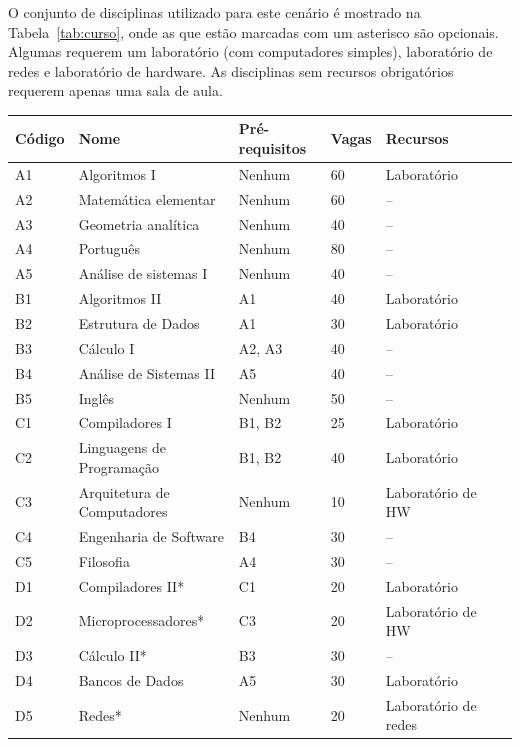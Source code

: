 O conjunto de disciplinas utilizado para este cenário é mostrado na Tabela~\ref{tab:curso}, onde as que estão marcadas com um asterisco são opcionais. Algumas requerem um laboratório (com computadores simples), laboratório de redes e laboratório de hardware. As disciplinas sem recursos obrigatórios requerem apenas uma sala de aula.

\begin{table}\centering\footnotesize
  \begin{tabular*}{1\textwidth}{@{}lllllll@{}}
    \toprule
    Código & Nome & Pré-requisitos & Vagas & Recursos \\
    \midrule
    A1 & Algoritmos I           & Nenhum & 60 & Laboratório \\
    A2 & Matemática elementar   & Nenhum & 60 & -- \\
    A3 & Geometria analítica    & Nenhum & 40 & -- \\
    A4 & Português              & Nenhum & 80 & -- \\
    A5 & Análise de sistemas I  & Nenhum & 40 & -- \\
    \midrule
    B1 & Algoritmos II          & A1 & 40 & Laboratório \\
    B2 & Estrutura de Dados     & A1 & 30 & Laboratório \\
    B3 & Cálculo I              & A2, A3 & 40 & -- \\
    B4 & Análise de Sistemas II & A5 & 40 & -- \\
    B5 & Inglês                 & Nenhum & 50 & -- \\
    \midrule
    C1 & Compiladores I         & B1, B2 & 25 & Laboratório \\
    C2 & Linguagens de Programação & B1, B2 & 40 & Laboratório \\
    C3 & Arquitetura de Computadores & Nenhum & 10 & Laboratório de HW \\
    C4 & Engenharia de Software & B4 & 30 & -- \\
    C5 & Filosofia              & A4 & 30 & -- \\
    \midrule
    D1 & Compiladores II*       & C1 & 20 & Laboratório \\
    D2 & Microprocessadores*    & C3 & 20 & Laboratório de HW \\
    D3 & Cálculo II*            & B3 & 30 & -- \\
    D4 & Bancos de Dados        & A5 & 30 & Laboratório \\
    D5 & Redes*                 & Nenhum & 20 & Laboratório de redes \\

\end{tabular*}
\end{table}
